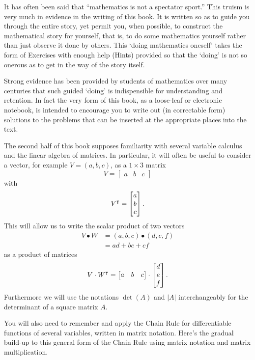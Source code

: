 \documentclass{ximera}
\begin{document}
It has often been said that ``mathematics is not a spectator sport.''
This truism is very much in evidence in the writing of this book. It
is written so as to guide you through the entire story, yet permit
you, when possible, to construct the mathematical story for yourself,
that is, to do some mathematics yourself rather than just observe it
done by others. This `doing mathematics oneself' takes the form of
Exercises with enough help (Hints) provided so that the `doing' is not
so onerous as to get in the way of the story itself.

Strong evidence has been provided by students of mathematics over many
centuries that such guided `doing' is indispensible for understanding and
retention. In fact the very form of this book, as a loose-leaf or electronic
notebook, is intended to encourage you to write out (in correctable form)
solutions to the problems that can be inserted at the appropriate places into
the text.

The second half of this book supposes familiarity with several
variable calculus and the linear algebra of matrices. In particular,
it will often be useful to consider a vector, for example
$V=\left(a,b,c\right)$, as a $1\times3$ matrix
\[
V=
\begin{bmatrix}
a & b & c
\end{bmatrix}
\]
with
\[
V^\intercal  =
\begin{bmatrix}
a\\
b\\
c
\end{bmatrix}.
\]
This will allow us to write the scalar product of two vectors%
\begin{align*}
V\bullet W  &  =\left(  a,b,c\right)  \bullet\left(d,e,f\right) \\
&  =ad+be+cf%
\end{align*}
as a product of matrices%
\[
V\cdot W^\intercal=
\begin{bmatrix}
a & b & c
\end{bmatrix} 
\cdot
\begin{bmatrix}
d\\
e\\
f
\end{bmatrix}.
\]
Furthermore we will use the notations $\det(A)$ and $|A|$
interchangeably for the determinant of a square matrix $A$.

You will also need to remember and apply the Chain Rule for differentiable
functions of several variables, written in matrix notation. Here's the
gradual build-up to this general form of the Chain Rule using matrix
notation and matrix multiplication.
\end{document}
